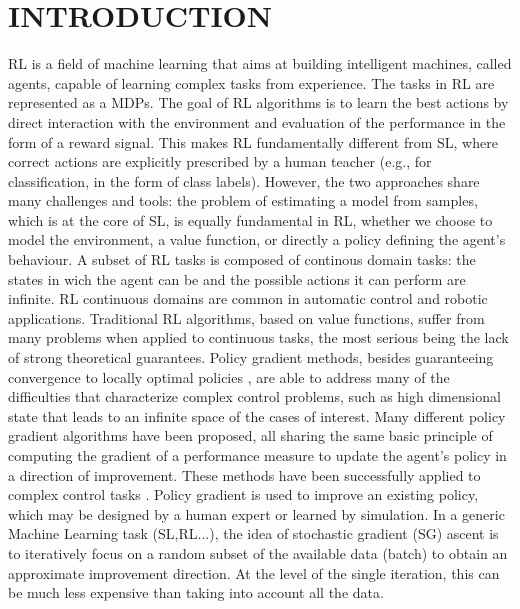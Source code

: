 
\chapter{INTRODUCTION} \label{chap:aChapter}

\ac{RL} is a field of machine learning that aims at building intelligent machines, called agents, capable of learning complex tasks from experience.
The tasks in \acs{RL} are represented as a \acs{MDP}s. 
The goal of \acs{RL} \citep{sutton1998reinforcement} algorithms is to learn the best actions by direct interaction with the environment and evaluation of the performance in the form of a reward signal.
This makes \acs{RL} fundamentally different from \ac{SL}, where correct actions are explicitly prescribed by a human teacher (e.g., for classification, in the form of class labels).
However, the two approaches share many challenges and tools: the problem of estimating a model from samples, which is at the core of \acs{SL}, is equally fundamental in \acs{RL}, whether we choose to model the environment, a value function, or directly a policy defining the agent’s behaviour.
A subset of \acs{RL} tasks is composed of continous domain tasks: the states in wich the agent can be and the possible actions it can perform are infinite.
\acs{RL} continuous domains are common in automatic control and robotic applications. Traditional \acs{RL} algorithms, based on value functions, suffer from many problems when applied to continuous tasks, the most serious being the lack of strong theoretical guarantees. Policy gradient methods, besides guaranteeing convergence to locally optimal policies \citep{sutton2000policy}, are able to address many of the difficulties that characterize complex control problems, such as high dimensional state that leads to an infinite space of the cases of interest. 
Many different policy gradient algorithms have been proposed, all sharing the same basic principle of computing the gradient of a performance measure to update the agent’s policy in a direction of improvement. These methods have been successfully applied to complex control tasks \citep{deisenroth2013survey}. Policy gradient is used to improve an existing policy, which may be designed by a human expert or learned by simulation.\newline
In a generic Machine Learning task (\acs{SL},\acs{RL}...), the idea of stochastic gradient (\acs{SG}) ascent \citep{nesterov2013introductory} is to iteratively focus on a random subset of the available data (batch) to obtain an approximate improvement direction. At the level of the single iteration, this can be much less expensive than taking into account all the data.
